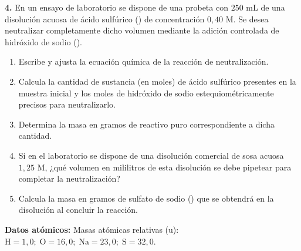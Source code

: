 \documentclass[11pt,a4paper]{article}
\begin{document}
\vspace{0.4cm}
\noindent\textbf{4.} En un ensayo de laboratorio se dispone de una probeta con $250\text{ mL}$ de una disolución acuosa de ácido sulfúrico () de concentración $0{,}40\text{ M}$. Se desea neutralizar completamente dicho volumen mediante la adición controlada de hidróxido de sodio ().
\begin{enumerate}[label=\textbf{\alph*)}, leftmargin=2em, itemsep=6pt]
    \item Escribe y ajusta la ecuación química de la reacción de neutralización.
    \item Calcula la cantidad de sustancia (en moles) de ácido sulfúrico presentes en la muestra inicial y los moles de hidróxido de sodio estequiométricamente precisos para neutralizarlo.
    \item Determina la masa en gramos de reactivo puro  correspondiente a dicha cantidad.
    \item Si en el laboratorio se dispone de una disolución comercial de sosa acuosa $1{,}25\text{ M}$, ¿qué volumen en mililitros de esta disolución se debe pipetear para completar la neutralización?
    \item Calcula la masa en gramos de sulfato de sodio () que se obtendrá en la disolución al concluir la reacción.
\end{enumerate}
\noindent\textbf{Datos atómicos:} Masas atómicas relativas ($\text{u}$): $\mathrm{H} = 1{,}0;\; \mathrm{O} = 16{,}0;\; \mathrm{Na} = 23{,}0;\; \mathrm{S} = 32{,}0$.
\end{document}
